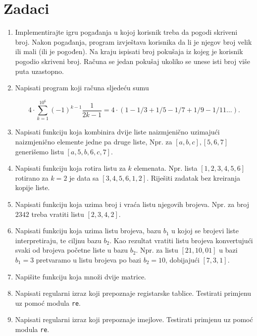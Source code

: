 \section*{Zadaci}
\begin{enumerate}
    
    \item Implementirajte igru pogađanja u kojoj korisnik treba da pogodi skriveni broj. Nakon pogađanja, program izvještava korisnika da li je njegov broj velik ili mali (ili je pogođen). Na kraju ispisati broj  pokušaja iz kojeg je korisnik pogodio skriveni broj. Računa se jedan pokušaj ukoliko se unese isti broj više puta uzastopno.
    
    
	\item Napisati program koji računa sljedeću sumu  
	
	$$ 4 \cdot \sum_{k=1}^{10^6}(-1)^{k-1} \frac{1}{2k-1}= 4 \cdot (1-1/3 + 1/5-1/7+1/9-1/11 \ldots).$$
	
	\item Napisati funkciju koja kombinira dvije liste naizmjenično uzimajući naizmjenično elemente jedne pa druge liste, Npr. za $[a,b,c], [5, 6, 7]$ generišemo listu $[a,5,b,6,c,7]$.
	
	\item Napisati funkciju koja rotira listu za $k$ elemenata. Npr. lista  $[1,2,3,4,5,6]$ rotirano za $k=2$ je data sa $[3,4,5,6,1,2]$. Riješiti zadatak bez kreiranja kopije liste. 
	
	\item Napisati funkciju koja uzima broj i vraća listu njegovih brojeva. Npr. za broj $2342$ treba vratiti listu $[2,3,4,2]$.
	
	\item Napisati funkciju koja uzima listu brojeva,   bazu $b_1$ u kojoj se brojevi liste interpretiraju, te ciljnu bazu $b_2$.  Kao rezultat vratiti listu brojeva konvertujući svaki od brojeva početne liste u bazu $b_2$. Npr. za listu $[21,10,01]$ u bazi $b_1 = 3$ pretvaramo u listu brojeva po bazi $b_2=10$, dobijajući $[7,3, 1]$.
	
	\item Napišite funkciju koja množi dvije matrice.
	 
	\item Napisati regularni izraz koji prepoznaje registarske tablice. Testirati primjenu uz pomoć modula \texttt{re}.
	
	\item Napisati regularni izraz koji prepoznaje imejlove. Testirati primjenu uz pomoć modula \texttt{re}.
	

\end{enumerate}
